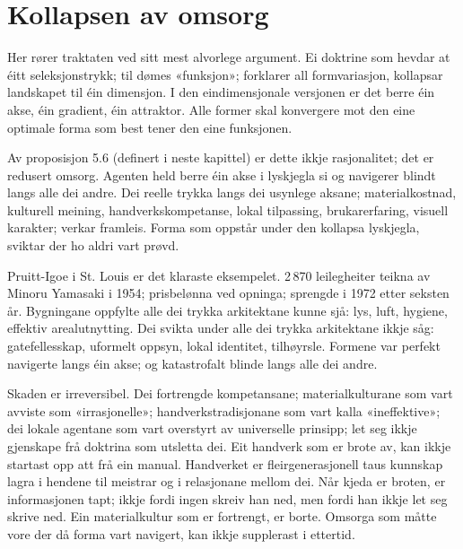 \section*{Kollapsen av omsorg}



Her rører traktaten ved sitt mest alvorlege argument. Ei doktrine som hevdar at éitt seleksjonstrykk; til dømes «funksjon»; forklarer all formvariasjon, kollapsar landskapet til éin dimensjon. I den eindimensjonale versjonen er det berre éin akse, éin gradient, éin attraktor. Alle former skal konvergere mot den eine optimale forma som best tener den eine funksjonen.

Av proposisjon 5.6 (definert i neste kapittel) er dette ikkje rasjonalitet; det er redusert omsorg. Agenten held berre éin akse i lyskjegla si og navigerer blindt langs alle dei andre. Dei reelle trykka langs dei usynlege aksane; materialkostnad, kulturell meining, handverkskompetanse, lokal tilpassing, brukarerfaring, visuell karakter; verkar framleis. Forma som oppstår under den kollapsa lyskjegla, sviktar der ho aldri vart prøvd.

Pruitt-Igoe i St. Louis er det klaraste eksempelet. 2\,870 leilegheiter teikna av Minoru Yamasaki i 1954; prisbelønna ved opninga; sprengde i 1972 etter seksten år. Bygningane oppfylte alle dei trykka arkitektane kunne sjå: lys, luft, hygiene, effektiv arealutnytting. Dei svikta under alle dei trykka arkitektane ikkje såg: gatefellesskap, uformelt oppsyn, lokal identitet, tilhøyrsle. Formene var perfekt navigerte langs éin akse; og katastrofalt blinde langs alle dei andre.

Skaden er irreversibel. Dei fortrengde kompetansane; materialkulturane som vart avviste som «irrasjonelle»; handverkstradisjonane som vart kalla «ineffektive»; dei lokale agentane som vart overstyrt av universelle prinsipp; let seg ikkje gjenskape frå doktrina som utsletta dei. Eit handverk som er brote av, kan ikkje startast opp att frå ein manual. Handverket er fleirgenerasjonell taus kunnskap lagra i hendene til meistrar og i relasjonane mellom dei. Når kjeda er broten, er informasjonen tapt; ikkje fordi ingen skreiv han ned, men fordi han ikkje let seg skrive ned. Ein materialkultur som er fortrengt, er borte. Omsorga som måtte vore der då forma vart navigert, kan ikkje supplerast i ettertid.

